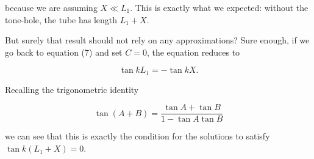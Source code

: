   \noindent{}because we are assuming $X \ll L_1$. This is exactly what we 
  expected: without the tone-hole, the tube has length $L_1+X$. 

  But surely that result should not rely on any approximations? Sure enough, if 
  we go back to equation (7) and set $C=0$, the equation reduces to 

  \begin{equation*}\tan k L_1 =-\tan kX . \tag{13}\end{equation*} 

  Recalling the trigonometric identity 

  \begin{equation*}\tan(A+B)=\dfrac{\tan A + \tan B}{1-\tan A \tan B} 
  \tag{14}\end{equation*} 

  \noindent{}we can see that this is exactly the condition for the solutions to 
  satisfy $\tan k(L_1+X)=0$. 
